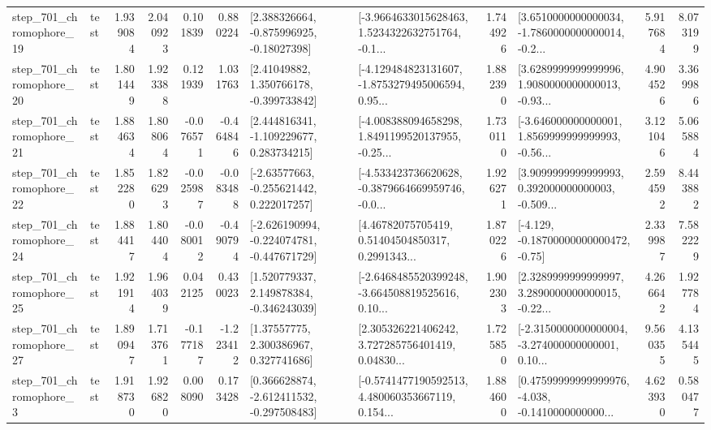 \begin{tabular}{llrrrrllrlrr}
  step\_701\_chromophore\_19 &      test &      1.939084 &    2.040923 &      0.101839 &  0.880224 &    [2.388326664, -0.875996925, -0.18027398] &  [-3.9664633015628463, 1.5234322632751764, -0.1... &       1.744926 &  [3.6510000000000034, -1.7860000000000014, -0.2... &            5.917684 &          8.073199 \\
  step\_701\_chromophore\_20 &      test &      1.801449 &    1.923388 &      0.121939 &  1.031763 &     [2.41049882, 1.350766178, -0.399733842] &  [-4.129484823131607, -1.8753279495006594, 0.95... &       1.882390 &  [3.6289999999999996, 1.9080000000000013, -0.93... &            4.904526 &          3.369986 \\
  step\_701\_chromophore\_21 &      test &      1.884634 &    1.808064 &     -0.076571 & -0.464846 &    [2.444816341, -1.109229677, 0.283734215] &  [-4.008388094658298, 1.8491199520137955, -0.25... &       1.730110 &  [-3.646000000000001, 1.8569999999999993, -0.56... &            3.121046 &          5.065884 \\
  step\_701\_chromophore\_22 &      test &      1.852280 &    1.826293 &     -0.025987 & -0.083488 &    [-2.63577663, -0.255621442, 0.222017257] &  [-4.533423736620628, -0.3879664669959746, -0.0... &       1.926271 &  [3.9099999999999993, 0.392000000000003, -0.509... &            2.594592 &          8.443882 \\
  step\_701\_chromophore\_24 &      test &      1.884417 &    1.804404 &     -0.080012 & -0.490794 &  [-2.626190994, -0.224074781, -0.447671729] &  [4.46782075705419, 0.51404504850317, 0.2991343... &       1.870226 &              [-4.129, -0.18700000000000472, -0.75] &            2.339987 &          7.582229 \\
  step\_701\_chromophore\_25 &      test &      1.921914 &    1.964039 &      0.042125 &  0.430023 &    [1.520779337, 2.149878384, -0.346243039] &  [-2.6468485520399248, -3.664508819525616, 0.10... &       1.902303 &  [2.3289999999999997, 3.2890000000000015, -0.22... &            4.266642 &          1.927784 \\
  step\_701\_chromophore\_27 &      test &      1.890947 &    1.713761 &     -0.177187 & -1.223412 &      [1.37557775, 2.300386967, 0.327741686] &  [2.305326221406242, 3.727285756401419, 0.04830... &       1.725850 &  [-2.3150000000000004, -3.274000000000001, 0.10... &            9.560355 &          4.135445 \\
   step\_701\_chromophore\_3 &      test &      1.918730 &    1.926820 &      0.008090 &  0.173428 &   [0.366628874, -2.612411532, -0.297508483] &  [-0.5741477190592513, 4.480060353667119, 0.154... &       1.884600 &  [0.47599999999999976, -4.038, -0.1410000000000... &            4.623930 &          0.580477 \\

\end{tabular}
